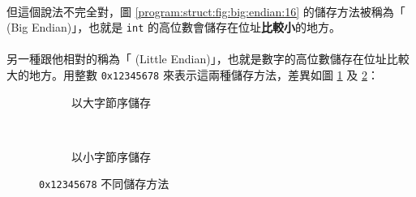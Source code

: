 \documentclass[12pt,a4paper,oneside]{report}
\begin{document}
\begin{CJK}{UTF8}{bkai}
\paragraph{}但這個說法不完全對，圖 \ref{program:struct:fig:big:endian:16} 的儲存方法被稱為「 (Big Endian)」，也就是 \lstinline!int! 的高位數會儲存在位址\textbf{比較小}的地方。
\paragraph{}另一種跟他相對的稱為「 (Little Endian)」，也就是數字的高位數儲存在位址比較大的地方。用整數 \texttt{0x12345678} 來表示這兩種儲存方法，差異如圖 \ref{program:struct:fig:big:endian} 及 \ref{program:struct:fig:little:endian}：

\begin{figure}[h!]
\centering
\begin{subfigure}{0.4\textwidth}
  \centering
  \caption{以大字節序儲存}
  \label{program:struct:fig:big:endian}
\end{subfigure}
~
\begin{subfigure}{0.4\textwidth}
  \centering
  \caption{以小字節序儲存}
  \label{program:struct:fig:little:endian}
\end{subfigure}
\caption{\texttt{0x12345678} 不同儲存方法}
\label{program:struct:fig:big:little:endian}
\end{figure}


\end{CJK}
\end{document}

